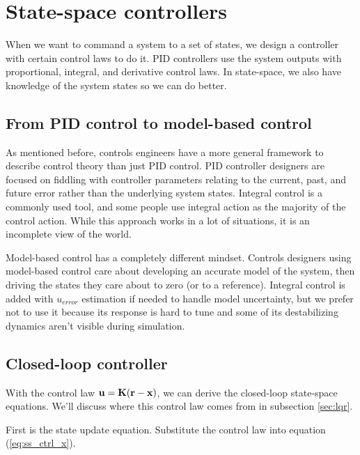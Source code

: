 
\chapter{State-space controllers}

When we want to command a \gls{system} to a set of states, we design a
controller with certain \glspl{control law} to do it. PID controllers use the
system outputs with proportional, integral, and derivative \glspl{control law}.
In state-space, we also have knowledge of the system states so we can do better.

\section{From PID control to model-based control}

As mentioned before, controls engineers have a more general framework to
describe control theory than just PID control. PID controller designers are
focused on fiddling with controller parameters relating to the current, past,
and future error rather than the underlying system states. Integral control is a
commonly used tool, and some people use integral action as the majority of the
control action. While this approach works in a lot of situations, it is an
incomplete view of the world.

Model-based control has a completely different mindset. Controls designers using
model-based control care about developing an accurate model of the system, then
driving the states they care about to zero (or to a \gls{reference}). Integral
control is added with $u_{error}$ estimation if needed to handle model
uncertainty, but we prefer not to use it because its response is hard to tune
and some of its destabilizing dynamics aren't visible during simulation.

\section{Closed-loop controller}

With the \gls{control law} $\mathbf{u} = \mathbf{K}(\mathbf{r} - \mathbf{x})$, we can derive
the closed-loop state-space equations. We'll discuss where this control law
comes from in subsection \ref{sec:lqr}.

First is the state update equation. Substitute the control law into equation
(\ref{eq:ss_ctrl_x}).

